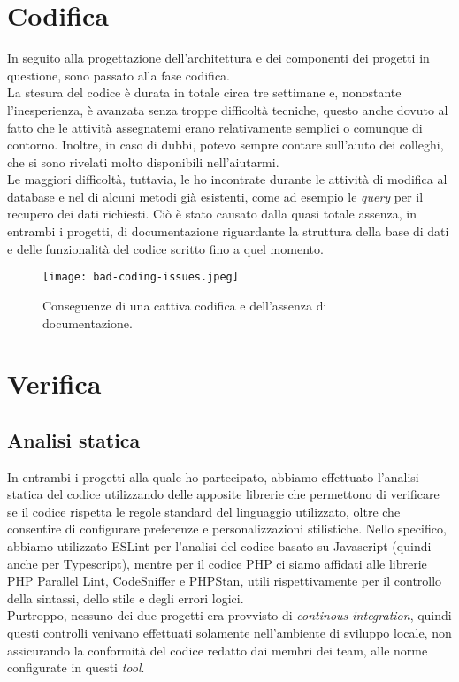 \section{Codifica}
In seguito alla progettazione dell'architettura e dei componenti dei progetti in questione, sono passato alla fase codifica.\\
La stesura del codice è durata in totale circa tre settimane e, nonostante l'inesperienza, è avanzata senza troppe difficoltà tecniche, questo anche dovuto al fatto che le attività assegnatemi erano relativamente semplici o comunque di contorno. Inoltre, in caso di dubbi, potevo sempre contare sull'aiuto dei colleghi, che si sono rivelati molto disponibili nell'aiutarmi.\\
Le maggiori difficoltà, tuttavia, le ho incontrate durante le attività di modifica al database e nel  di alcuni metodi già esistenti, come ad esempio le \textit{query} per il recupero dei dati richiesti. Ciò è stato causato dalla quasi totale assenza, in entrambi i progetti, di documentazione riguardante la struttura della base di dati e delle funzionalità del codice scritto fino a quel momento. 
\begin{figure}[h]
\texttt{[image: bad-coding-issues.jpeg]}
\centering
\caption{Conseguenze di una cattiva codifica e dell'assenza di documentazione.} 
\label{fig:bad-coding-issues}
\end{figure}
\section{Verifica}
\subsection{Analisi statica}
In entrambi i progetti alla quale ho partecipato, abbiamo effettuato l'analisi statica del codice utilizzando delle apposite librerie che permettono di verificare se il codice rispetta le regole standard del linguaggio utilizzato, oltre che consentire di configurare preferenze e personalizzazioni stilistiche.
Nello specifico, abbiamo utilizzato ESLint per l'analisi del codice basato su Javascript (quindi anche per Typescript), mentre per il codice PHP ci siamo affidati alle librerie PHP Parallel Lint, CodeSniffer e PHPStan, utili rispettivamente per il controllo della sintassi, dello stile e degli errori logici.\\
Purtroppo, nessuno dei due progetti era provvisto di \textit{continous integration}, quindi questi controlli venivano effettuati solamente nell'ambiente di sviluppo locale, non assicurando la conformità del codice redatto dai membri dei team, alle norme configurate in questi \textit{tool}.
